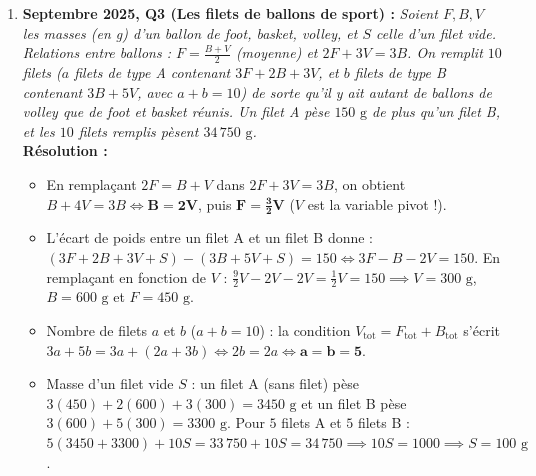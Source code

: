 \begin{exemple}
\begin{enumerate}
    \item \textbf{Septembre 2025, Q3 (Les filets de ballons de sport) :}
    \emph{Soient $F, B, V$ les masses (en g) d'un ballon de foot, basket, volley, et $S$ celle d'un filet vide.
    Relations entre ballons : $F = \frac{B + V}{2}$ (moyenne) et $2F + 3V = 3B$.
    On remplit $10$ filets ($a$ filets de type A contenant $3F + 2B + 3V$, et $b$ filets de type B contenant $3B + 5V$, avec $a + b = 10$) de sorte qu'il y ait autant de ballons de volley que de foot et basket réunis. Un filet A pèse $150\text{ g}$ de plus qu'un filet B, et les $10$ filets remplis pèsent $34\,750\text{ g}$.}\\
    \textbf{Résolution :}
    \begin{itemize}
        \item En remplaçant $2F = B + V$ dans $2F + 3V = 3B$, on obtient $B + 4V = 3B \iff \mathbf{B = 2V}$, puis $\mathbf{F = \frac{3}{2}V}$ ($V$ est la variable pivot !).
        \item L'écart de poids entre un filet A et un filet B donne : $(3F + 2B + 3V + S) - (3B + 5V + S) = 150 \iff 3F - B - 2V = 150$. En remplaçant en fonction de $V$ : $\frac{9}{2}V - 2V - 2V = \frac{1}{2}V = 150 \implies \boxed{V = 300\text{ g}}$, $\boxed{B = 600\text{ g}}$ et $\boxed{F = 450\text{ g}}$.
        \item Nombre de filets $a$ et $b$ ($a + b = 10$) : la condition $V_{\text{tot}} = F_{\text{tot}} + B_{\text{tot}}$ s'écrit $3a + 5b = 3a + (2a + 3b) \iff 2b = 2a \iff \mathbf{a = b = 5}$.
        \item Masse d'un filet vide $S$ : un filet A (sans filet) pèse $3(450) + 2(600) + 3(300) = 3450\text{ g}$ et un filet B pèse $3(600) + 5(300) = 3300\text{ g}$. Pour $5$ filets A et $5$ filets B : $5(3450 + 3300) + 10S = 33\,750 + 10S = 34\,750 \implies 10S = 1000 \implies \boxed{S = 100\text{ g}}$.
    \end{itemize}


\end{enumerate}
\end{exemple}
